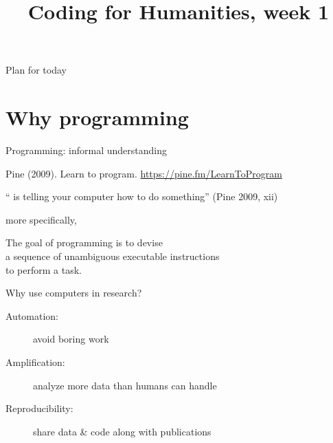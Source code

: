 \documentclass[aspectratio=169,usenames,dvipsnames]{beamer}
\title{Coding for Humanities, week 1}
\begin{document}
\begin{frame}
 \titlepage
\end{frame}

\begin{frame}{Plan for today}
 \tableofcontents
\end{frame}




\section{Why programming}
\frame{\tableofcontents[currentsection]}
\begin{frame}{Programming: informal understanding}
    \begin{reference}
        Pine (2009). Learn to program. \url{https://pine.fm/LearnToProgram}
    \end{reference}
    \begin{definition}
        `` is telling your computer
        how to do something'' (Pine 2009, xii)
    \end{definition}

    \pause\vspace{1em}
    more specifically,

    \vspace{1em}
    The goal of programming is to devise \\
    a sequence of unambiguous executable instructions \\
    to perform a task.
\end{frame}

\begin{frame}{Why use computers in research?}
	\pause

    \begin{description}
        \item[Automation:] avoid boring work
        \item[Amplification:] analyze more data than humans can handle
        \item[Reproducibility:] share data \& code along with publications
    \end{description}
\end{frame}
\end{document}
